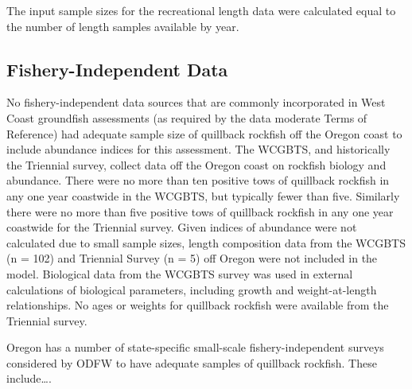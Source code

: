 \documentclass[11pt,
  english,
  a4paper,
]{article}
\begin{document}
\leavevmode\tagmcend\tagstructend\par


The input sample sizes for the recreational length data were calculated equal to the number of length samples available by year.

\leavevmode\tagmcend\tagstructend\par


\hypertarget{fishery-independent-data}{%
\subsection{Fishery-Independent Data}\label{fishery-independent-data}}

\leavevmode\tagmcend\tagstructend


No fishery-independent data sources that are commonly incorporated in West Coast groundfish assessments (as required by the data moderate Terms of Reference) had adequate sample size of quillback rockfish off the Oregon coast to include abundance indices for this assessment. The WCGBTS, and historically the Triennial survey, collect data off the Oregon coast on rockfish biology and abundance. There were no more than ten positive tows of quillback rockfish in any one year coastwide in the WCGBTS, but typically fewer than five. Similarly there were no more than five positive tows of quillback rockfish in any one year coastwide for the Triennial survey. Given indices of abundance were not calculated due to small sample sizes, length composition data from the WCGBTS (n = 102) and Triennial Survey (n = 5) off Oregon were not included in the model. Biological data from the WCGBTS survey was used in external calculations of biological parameters, including growth and weight-at-length relationships. No ages or weights for quillback rockfish were available from the Triennial survey.

\leavevmode\tagmcend\tagstructend\par


Oregon has a number of state-specific small-scale fishery-independent surveys considered by ODFW to have adequate samples of quillback rockfish. These include\ldots.

\leavevmode\tagmcend\tagstructend\par
\end{document}
